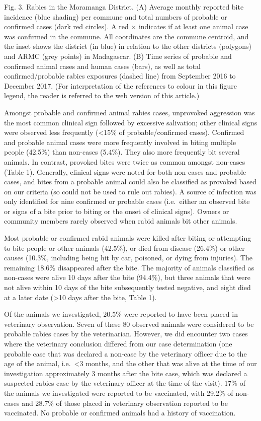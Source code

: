 \documentclass[
]{book}
\begin{document}
Fig. 3. Rabies in the Moramanga District. (A) Average monthly reported bite incidence (blue shading) per commune and total numbers of probable or confirmed cases (dark red circles). A red × indicates if at least one animal case was confirmed in the commune. All coordinates are the commune centroid, and the inset shows the district (in blue) in relation to the other districts (polygons) and ARMC (grey points) in Madagascar. (B) Time series of probable and confirmed animal cases and human cases (bars), as well as total confirmed/probable rabies exposures (dashed line) from September 2016 to December 2017. (For interpretation of the references to colour in this figure legend, the reader is referred to the web version of this article.)

Amongst probable and confirmed animal rabies cases, unprovoked aggression was the most common clinical sign followed by excessive salivation; other clinical signs were observed less frequently (\textless15\% of probable/confirmed cases). Confirmed and probable animal cases were more frequently involved in biting multiple people (42.5\%) than non-cases (5.4\%). They also more frequently bit several animals. In contrast, provoked bites were twice as common amongst non-cases (Table 1). Generally, clinical signs were noted for both non-cases and probable cases, and bites from a probable animal could also be classified as provoked based on our criteria (so could not be used to rule out rabies). A source of infection was only identified for nine confirmed or probable cases (i.e.~either an observed bite or signs of a bite prior to biting or the onset of clinical signs). Owners or community members rarely observed when rabid animals bit other animals.

Most probable or confirmed rabid animals were killed after biting or attempting to bite people or other animals (42.5\%), or died from disease (26.4\%) or other causes (10.3\%, including being hit by car, poisoned, or dying from injuries). The remaining 18.6\% disappeared after the bite. The majority of animals classified as non-cases were alive 10 days after the bite (94.4\%), but three animals that were not alive within 10 days of the bite subsequently tested negative, and eight died at a later date (\textgreater10 days after the bite, Table 1).

Of the animals we investigated, 20.5\% were reported to have been placed in veterinary observation. Seven of these 80 observed animals were considered to be probable rabies cases by the veterinarian. However, we did encounter two cases where the veterinary conclusion differed from our case determination (one probable case that was declared a non-case by the veterinary officer due to the age of the animal, i.e.~\textless3 months, and the other that was alive at the time of our investigation approximately 3 months after the bite case, which was declared a suspected rabies case by the veterinary officer at the time of the visit). 17\% of the animals we investigated were reported to be vaccinated, with 29.2\% of non-cases and 28.7\% of those placed in veterinary observation reported to be vaccinated. No probable or confirmed animals had a history of vaccination.
\end{document}
